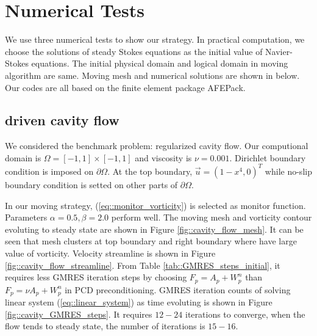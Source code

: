 \documentclass{eajam}
\begin{document}
 
\section{Numerical Tests}
      \label{sec5} We use three numerical tests to show our strategy.
      In practical computation, we choose the solutions of steady
      Stokes equations as the initial value of Navier-Stokes
      equations. The initial physical domain
      and logical domain in moving algorithm are same. Moving mesh
      and numerical solutions are shown in below. Our codes are all
      based on the finite element package AFEPack.

     \subsection{driven cavity flow}
       We considered the benchmark problem: regularized cavity flow. Our
       computional domain is $\Omega = [-1, 1] \times [-1, 1]$ and
       viscosity is $\nu = 0.001$. Dirichlet boundary condition is
       imposed on $\partial \Omega$. At the top boundary, $\vec{u} =
       (1 - x^4, 0)^T$ while no-slip boundary condition is setted on
       other parts of $\partial \Omega$.
       
       In our moving strategy, (\ref{eq::monitor_vorticity}) is
       selected as monitor function. Parameters $\alpha = 0.5, \beta =
       2.0$ perform well. The moving mesh and vorticity contour
       evoluting to steady state are shown in Figure
       \ref{fig::cavity_flow_mesh}. It can be seen that mesh clusters
       at top boundary and right boundary where have large value of
       vorticity. Velocity streamline is shown in Figure
       \ref{fig::cavity_flow_streamline}.
       From Table \ref{tab::GMRES_steps_initial}, it requires less GMRES
       iteration steps by choosing $F_p = A_p + W_p^n$ than $F_p = \nu
       A_p + W_p^n$ in PCD preconditioning. GMRES iteration
       counts of solving linear system (\ref{eq::linear_system}) as
       time evoluting is shown in Figure \ref{fig::cavity_GMRES_steps}.
       It requires $12-24$ iterations to converge, when the flow tends
       to steady state, the number of iterations is $15 - 16$.
       
\end{document}
